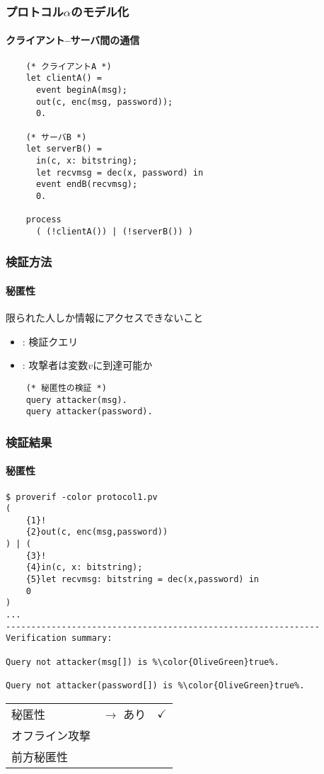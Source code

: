 \documentclass[dvipdfmx, dvipsnames, 11pt]{beamer}
\newcommand{\code}[1]{ \texttt{\detokenize{#1}} }
\begin{document}
\begin{frame}[fragile]
  \frametitle{プロトコル{\LARGE$\alpha$}のモデル化}
  \framesubtitle{クライアント--サーバ間の通信}

  \begin{lstlisting}
    (* クライアントA *)
    let clientA() =
      event beginA(msg);
      out(c, enc(msg, password));
      0.

    (* サーバB *)
    let serverB() =
      in(c, x: bitstring);
      let recvmsg = dec(x, password) in
      event endB(recvmsg);
      0.

    process
      ( (!clientA()) | (!serverB()) )
  \end{lstlisting}
\end{frame}

\begin{frame}[fragile]
  \frametitle{検証方法}
  \framesubtitle{秘匿性}

  限られた人しか情報にアクセスできないこと

  \vspace{2em}
  \begin{itemize}
    \item \code{query} : 検証クエリ
    \item \code{attacker(v)} : 攻撃者は変数$v$に到達可能か
  \end{itemize}

  \vspace{2em}
  \begin{lstlisting}
    (* 秘匿性の検証 *)
    query attacker(msg).
    query attacker(password).
  \end{lstlisting}
\end{frame}

\begin{frame}[fragile]
  \frametitle{検証結果}
  \framesubtitle{秘匿性}

  \begin{lstlisting}[basicstyle=\ttfamily\tiny, frame=single]
$ proverif -color protocol1.pv
(
    {1}!
    {2}out(c, enc(msg,password))
) | (
    {3}!
    {4}in(c, x: bitstring);
    {5}let recvmsg: bitstring = dec(x,password) in
    0
)
...
--------------------------------------------------------------
Verification summary:

Query not attacker(msg[]) is %\color{OliveGreen}true%.

Query not attacker(password[]) is %\color{OliveGreen}true%.
  \end{lstlisting}
  
  \begin{table}
    \centering
    \begin{tabular}{lll}
      秘匿性 & $\rightarrow$ あり & \color{OliveGreen}$\checkmark$ \\
      \color{gray}オフライン攻撃 &  &  \\
      \color{gray}前方秘匿性 &  &
    \end{tabular}
  \end{table}
\end{frame}
\end{document}

